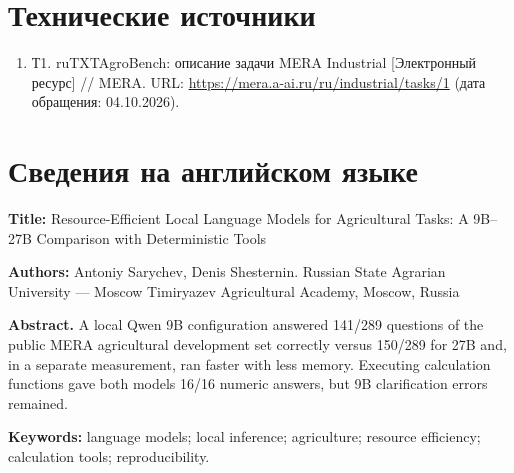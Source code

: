 \documentclass[14pt,a4paper]{extarticle}
\begin{document}
\section*{Технические источники}
\begingroup\sloppy\fontsize{11}{13}\selectfont \begin{enumerate}[label={},leftmargin=0.9cm,itemindent=-0.9cm,itemsep=0pt,parsep=0pt,topsep=2pt]
\item Т1. ruTXTAgroBench: описание задачи MERA Industrial [Электронный ресурс] // MERA. URL: \url{https://mera.a-ai.ru/ru/industrial/tasks/1} (дата обращения: 04.10.2026).
\end{enumerate}\endgroup
\section*{Сведения на английском языке}
{\noindent\fontsize{11}{13}\selectfont \textbf{Title:} Resource-Efficient Local Language Models for Agricultural Tasks: A 9B–27B Comparison with Deterministic Tools\par}\smallskip
{\noindent\fontsize{11}{13}\selectfont \textbf{Authors:} Antoniy Sarychev, Denis Shesternin. Russian State Agrarian University — Moscow Timiryazev Agricultural Academy, Moscow, Russia\par}\smallskip
{\noindent\fontsize{11}{13}\selectfont \textbf{Abstract.} A local Qwen 9B configuration answered 141/289 questions of the public MERA agricultural development set correctly versus 150/289 for 27B and, in a separate measurement, ran faster with less memory. Executing calculation functions gave both models 16/16 numeric answers, but 9B clarification errors remained.\par}\smallskip
{\noindent\fontsize{11}{13}\selectfont \textbf{Keywords:} language models; local inference; agriculture; resource efficiency; calculation tools; reproducibility.\par}\smallskip
{}
\end{document}
